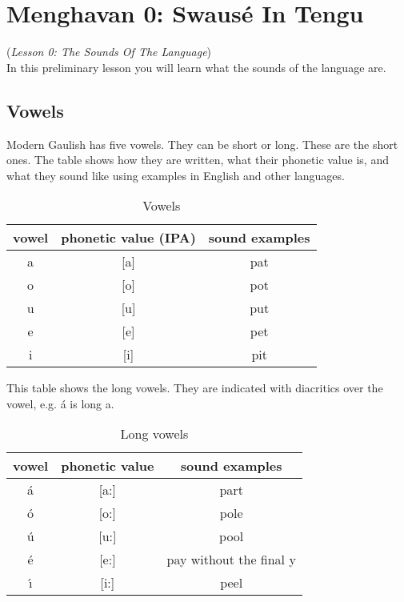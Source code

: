 \section{Menghavan 0: Swaus\'{e} In Tengu}
(\textit{Lesson 0: The Sounds Of The Language})\\

\noindent In this preliminary lesson you will learn what the sounds of the language are.

\subsection{Vowels}
\noindent Modern Gaulish has five vowels. They can be short or long. These are the short ones. The table shows how they are written, what their phonetic value is, and what they sound like using examples in English and other languages.

\begin{table}[H]
\begin{center}
\begin{tabu}{|c|c|c|}
  \toprule
  vowel & phonetic value (IPA) & sound examples\\
  \midrule
  a & [a] & pat\\
  o & [o] & pot\\
  u & [u] & put\\
  e & [e] & pet\\
  i & [i] & pit\\
  \bottomrule
\end{tabu}
\end{center}
\caption{Vowels}
\label{phonology_vowels}
\end{table}

\noindent This table shows the long vowels. They are indicated with diacritics over the vowel, e.g. \'{a} is long a.

\begin{table}[H]
\begin{center}
\begin{tabu}{|c|c|c|}
  \toprule
  vowel & phonetic value & sound examples\\
  \midrule
  \'{a} & [a:] & part\\
  \'{o} & [o:] & pole\\
  \'{u} & [u:] & pool\\
  \'{e} & [e:] & pay without the final y\\
  \'{\i} & [i:] & peel\\
  \bottomrule
\end{tabu}
\end{center}
\caption{Long vowels}
\label{phonology_long_vowels}
\end{table}

